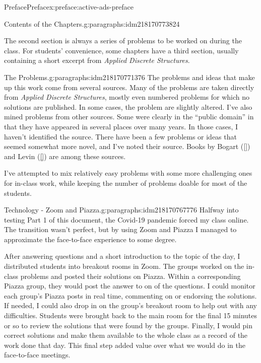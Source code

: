 \documentclass[oneside,10pt,]{book}
\newcommand{\xreffont}{\relax}
\numberwithin{equation}{section}
\begin{document}
\begin{preface}{Preface}{}{Preface}{}{}{x:preface:active-ads-preface}
\begin{paragraphs}{Contents of the Chapters.}{g:paragraphs:idm218170773824}
\par
The second section is always a series of problems to be worked on during the class. For students' convenience, some chapters have a third section, usually containing a short excerpt from \emph{Applied Discrete Structures}.%
\end{paragraphs}%
\begin{paragraphs}{The Problems.}{g:paragraphs:idm218170771376}%
The problems and ideas that make up this work come from several sources.  Many of the problems are taken directly from \emph{Applied Discrete Structures}, mostly even numbered problems for which no solutions are published. In some cases, the problem are slightly altered.  I've also mined problems from other sources.  Some were clearly in the ``public domain'' in that they have appeared in several places over many years.  In those cases, I haven't identified the source.   There have been a few problems or ideas that seemed somewhat more novel, and I've noted their source. Books by Bogart (\hyperlink{x:biblio:biblio-bogart-2017}{[{\xreffont 1}]}) and Levin (\hyperlink{x:biblio:biblio-levin-2020}{[{\xreffont 3}]}) are among these sources.%
\par
I've attempted to mix relatively easy problems with some more challenging ones for in-class work, while keeping the number of problems doable for most of the students.%
\end{paragraphs}%
\begin{paragraphs}{Technology - Zoom and Piazza.}{g:paragraphs:idm218170767776}%
Halfway into testing Part 1 of this document, the Covid-19 pandemic forced my class online. The transition wasn't perfect, but by using Zoom and Piazza I managed to approximate the face-to-face experience to some degree.%
\par
After answering questions and a short introduction to the topic of the day, I distributed students into breakout rooms in Zoom.  The groups worked on the in-class problems and posted their solutions on Piazza.  Within a corresponding Piazza group, they would post the answer to on of the questions.  I could monitor each group's Piazza posts in real time, commenting on or endorsing the solutions.  If needed, I could also drop in on the group's breakout room to help out with any difficulties. Students were brought back to the main room for the final 15 minutes or so to review the solutions that were found by the groups.  Finally, I would pin correct solutions and make them available to the whole class as a record of the work done that day. This final step added value over what we would do in the face-to-face meetings.%

\end{paragraphs}
\end{preface}
\end{document}
